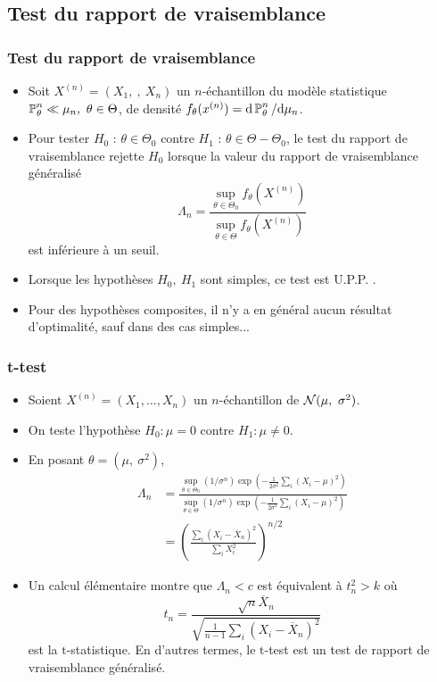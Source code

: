 \subsection{Test du rapport de vraisemblance}
\begin{frame}
\frametitle{Test du rapport de vraisemblance}
 \begin{itemize}
 \item Soit  $X^{(n)}= (X_{1},\ ,\ X_{n})$ un $n$-échantillon du modèle statistique $\PP_{\theta}^{n}\ll\mu_{n},\ \theta\in\Theta$, de densité  $f_{\theta}(x^{(n)})= \mathrm{d} \operatorname{{\mathbb P}}_{\theta}^{n}/ \mathrm{d} \mu_{n}$.
 \item Pour tester $H_{0}$ : $\theta\in\Theta_{0}$  contre $H_{1}$ : $\theta\in\Theta-\Theta_{0}$, le test du \alert{rapport de vraisemblance} rejette $H_{0}$ lorsque la valeur du \alert{rapport de vraisemblance généralisé}
$$
\Lambda_{n}=\frac{\sup_{\theta\in\Theta_{0}}f_{\theta}(X^{(n)})}{\sup_{\theta\in\Theta}f_{\theta}(X^{(n)})}
$$
est inférieure à un seuil.
\item   Lorsque les hypothèses $H_{0},\ H_{1}$ sont simples, ce test est U.P.P. .
\item Pour des hypothèses composites, il n'y a en général aucun résultat d'optimalité, sauf dans des cas simples...
\end{itemize}
\end{frame}

\begin{frame}
\frametitle{t-test}
\begin{itemize}
\item  Soient $X^{(n)}= (X_{1}, \dots, X_{n})$ un $n$-échantillon de $\mathcal{N}(\mu,\ \sigma^{2})$.
\item On teste l'hypothèse $H_0: \mu =0$ contre $H_1: \mu \ne 0$.
\item En posant $\theta=(\mu,\ \sigma^{2})$,
\begin{align*}
\Lambda_{n}&=\frac{\sup_{\theta\in\Theta_{0}}(1/\sigma^{n})\exp(-\frac{1}{2\sigma^{2}}\sum_{i}(X_{i}-\mu)^{2})}{\sup_{\theta\in\Theta}(1/\sigma^{n})\exp(-\frac{1}{2\sigma^{2}}\sum_{i}(X_{i}-\mu)^{2})}\\
&=(\frac{\sum_{i}(X_{i}-\overline{X}_{n})^{2}}{\sum_{i}X_{i}^{2}})^{n/2}
\end{align*}
\item Un calcul élémentaire montre que $\Lambda_{n}<c$ est équivalent à $t_{n}^{2}>k$ où
$$
t_{n}=\frac{\sqrt{n}\overline{X}_{n}}{\sqrt{\frac{1}{n-1}\sum_{i}(X_{i}-\overline{X}_{n})^{2}}}
$$
est la $\mathrm{t}$-statistique. En d'autres termes, le $\mathrm{t}$-test est un test de rapport de vraisemblance généralisé.
\end{itemize}
\end{frame}

